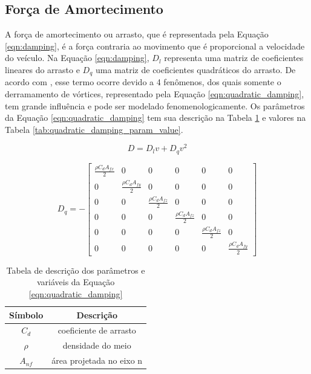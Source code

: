 \subsection{Força de Amortecimento}

A força de amortecimento ou arrasto, que é representada pela Equação \ref{eqn:damping}, é a força contraria ao movimento que é proporcional a velocidade do veículo. Na Equação \ref{eqn:damping}, $D_l$ representa uma matriz de coeficientes lineares do arrasto e $D_q$ uma matriz de coeficientes quadráticos do arrasto. De acordo com \cite{fossen2011handbook}, esse termo ocorre devido a 4 fenômenos, dos quais somente o derramamento de vórtices, representado pela Equação \ref{eqn:quadratic_damping}, tem grande influência e pode ser modelado fenomenologicamente. Os parâmetros da Equação \ref{eqn:quadratic_damping} tem sua descrição na Tabela \ref{tab:quadratic_damping_param_desc} e valores na Tabela \ref{tab:quadratic_damping_param_value}. 

\begin{equation}
	\label{eqn:damping}
	D = D_lv + D_qv^{2}
\end{equation}

\begin{equation}
	\label{eqn:quadratic_damping}
	D_q = -
	\begin{bmatrix}
		\frac{\rho C_dA_{fx}}{2} & 0 & 0 & 0 & 0 & 0\\
		0 & \frac{\rho C_dA_{fy}}{2} & 0 & 0 & 0 & 0\\
		0 & 0 & \frac{\rho C_dA_{fz}}{2} & 0 & 0 & 0\\
		0 & 0 & 0 & \frac{\rho C_dA_{fz}}{2} & 0 & 0\\
		0 & 0 & 0 & 0 & \frac{\rho C_dA_{fz}}{2} & 0\\
		0 & 0 & 0 & 0 & 0 & \frac{\rho C_dA_{fy}}{2} 
	\end{bmatrix}
\end{equation}

\begin{table}[H]
	\centering
	\label{tab:quadratic_damping_param_desc}
	\caption{Tabela de descrição dos parâmetros e variáveis da Equação \ref{eqn:quadratic_damping}}
	\begin{tabular}{ | c | c | } 
		\hline
		\textbf{Símbolo} & \textbf{Descrição}\\
		\hline
		$C_d$ & coeficiente de arrasto\\ 
		\hline
		$\rho$ & densidade do meio\\ 
		\hline
		$A_{nf}$ & área projetada no eixo n\\ 
		\hline
	\end{tabular}
\end{table}

